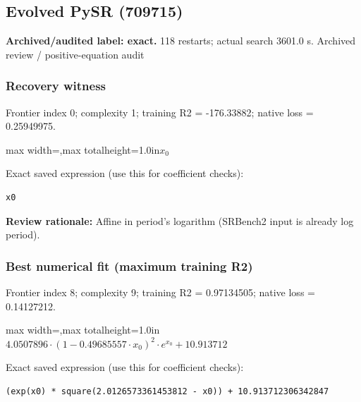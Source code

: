 \documentclass[10pt,letterpaper,landscape]{article}
\begin{document}
\begin{minipage}[t]{0.485\textwidth}
\subsection*{Evolved PySR (709715)}
\textbf{Archived/audited label: exact.} 118 restarts; actual search 3601.0 s.
{\small Archived review / positive-equation audit}
\subsubsection*{Recovery witness}
Frontier index 0; complexity 1; training R2 = -176.33882; native loss = 0.25949975.
\begin{center}\begin{adjustbox}{max width=\linewidth,max totalheight=1.0in}$\displaystyle x_{0}$\end{adjustbox}\end{center}
{\scriptsize Exact saved expression (use this for coefficient checks):}
\begin{lstlisting}
x0
\end{lstlisting}
{\small\textbf{Review rationale:} Affine in period's logarithm (SRBench2 input is already log period).}
\subsubsection*{Best numerical fit (maximum training R2)}
Frontier index 8; complexity 9; training R2 = 0.97134505; native loss = 0.14127212.
\begin{center}\begin{adjustbox}{max width=\linewidth,max totalheight=1.0in}$\displaystyle 4.0507896 \cdot \left(1 - 0.49685557 \cdot x_{0}\right)^{2} \cdot e^{x_{0}} + 10.913712$\end{adjustbox}\end{center}
{\scriptsize Exact saved expression (use this for coefficient checks):}
\begin{lstlisting}
(exp(x0) * square(2.0126573361453812 - x0)) + 10.913712306342847
\end{lstlisting}
\end{minipage}
\clearpage{}\label{leavitt-10007}
\end{document}
